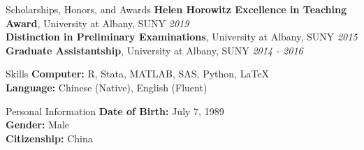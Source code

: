 \documentclass{resume_liang} %
\begin{document}
\begin{rSection}{Scholarships, Honors, and Awards} 
{\bf Helen Horowitz Excellence in Teaching Award}{, University at Albany, SUNY} \hfill{\em 2019}  \\ 
{\bf Distinction in Preliminary Examinations}{, University at Albany, SUNY} \hfill{\em 2015}  \\
{\bf Graduate Assistantship}{, University at Albany, SUNY} \hfill{\em 2014 - 2016}  \\
\end{rSection}
\bigskip \bigskip





\begin{rSection}{Skills}
{\bf Computer:} R, Stata, MATLAB, SAS, Python, LaTeX
\\
{\bf Language:} Chinese (Native), English (Fluent) 
\end{rSection}
\bigskip \bigskip









\begin{rSection}{Personal Information }
{\bf Date of Birth:} July 7, 1989  \\
{\bf Gender:} Male  \\
{\bf Citizenship:} China
\\
\end{rSection}
\end{document}
